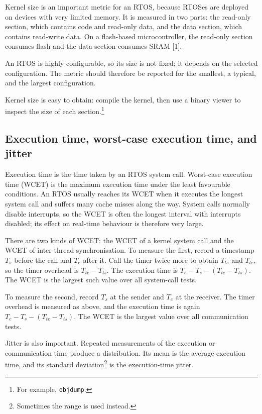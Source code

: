 Kernel size is an important metric for an RTOS, because RTOSes are deployed on devices with very limited memory.
It is measured in two parts: the read-only section, which contains code and read-only data, and the data section, which contains read-write data.
On a flash-based microcontroller, the read-only section consumes flash and the data section consumes SRAM [1].

An RTOS is highly configurable, so its size is not fixed; it depends on the selected configuration.
The metric should therefore be reported for the smallest, a typical, and the largest configuration.

Kernel size is easy to obtain: compile the kernel, then use a binary viewer to inspect the size of each section.\footnote{For example, \texttt{objdump}.}

\subsection{Execution time, worst-case execution time, and jitter}

Execution time is the time taken by an RTOS system call.
Worst-case execution time (WCET) is the maximum execution time under the least favourable conditions.
An RTOS usually reaches its WCET when it executes the longest system call and suffers many cache misses along the way.
System calls normally disable interrupts, so the WCET is often the longest interval with interrupts disabled; its effect on real-time behaviour is therefore very large.

There are two kinds of WCET: the WCET of a kernel system call and the WCET of inter-thread synchronisation.
To measure the first, record a timestamp \(T_s\) before the call and \(T_e\) after it.
Call the timer twice more to obtain \(T_{ts}\) and \(T_{te}\), so the timer overhead is \(T_{te}-T_{ts}\).
The execution time is \(T_e-T_s-(T_{te}-T_{ts})\).
The WCET is the largest such value over all system-call tests.

To measure the second, record \(T_s\) at the sender and \(T_e\) at the receiver.
The timer overhead is measured as above, and the execution time is again \(T_e-T_s-(T_{te}-T_{ts})\).
The WCET is the largest value over all communication tests.

Jitter is also important.
Repeated measurements of the execution or communication time produce a distribution.
Its mean is the average execution time, and its standard deviation\footnote{Sometimes the range is used instead.} is the execution-time jitter.


